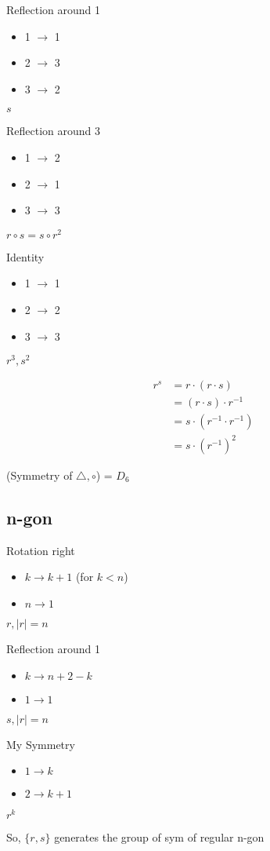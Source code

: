 \begin{multicols}{3}
Reflection around 1
\begin{itemize}
  \item 1 $\rightarrow$ 1
  \item 2 $\rightarrow$ 3
  \item 3 $\rightarrow$ 2
\end{itemize}
$s$

\par
Reflection around 3
\begin{itemize}
  \item 1 $\rightarrow$ 2
  \item 2 $\rightarrow$ 1
  \item 3 $\rightarrow$ 3
\end{itemize}
$r \circ s = s \circ r^2$
\par
Identity 
\begin{itemize}
  \item 1 $\rightarrow$ 1
  \item 2 $\rightarrow$ 2
  \item 3 $\rightarrow$ 3
\end{itemize}
$r^3, s^2$
\end{multicols}
\begin{align*}
  r^s &= r\cdot(r\cdot s) \\ 
  &= (r\cdot s) \cdot r^{-1} \\
  &= s \cdot (r^{-1} \cdot r^{-1}) \\
  &= s \cdot (r^{-1})^2
\end{align*}



(Symmetry of $\triangle, \circ$) = $D_6$
\pagebreak
\subsection{n-gon}


\begin{multicols}{3}
Rotation right
\begin{itemize}
  \item $k \rightarrow k + 1$ (for $k < n$)
  \item $n \rightarrow 1$
\end{itemize}
$r, |r| = n$
\par
Reflection around 1
\begin{itemize}
  \item $k \rightarrow n + 2 - k$
  \item $1 \rightarrow 1$
\end{itemize}
$s, |r| = n$
\par
My Symmetry
\begin{itemize}
  \item $1 \rightarrow k$
  \item $2 \rightarrow k + 1$
\end{itemize}
$r^k$
\end{multicols}
So, $\{r, s\}$ generates the group of sym of regular n-gon

